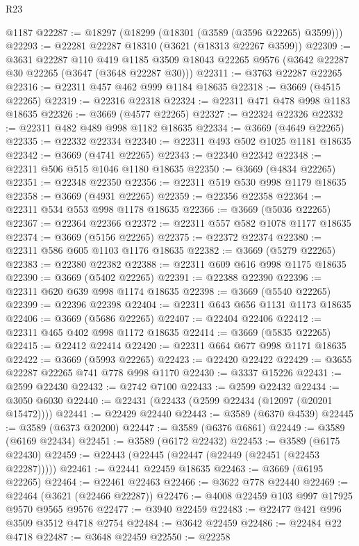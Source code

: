 \begin{lexlean}{R23}
\begin{coremodule}
    @1187
@22287 := @18297 (@18299 (@18301 (@3589 (@3596 @22265) @3599)))
@22293 := @22281 @22287 @18310 (@3621 (@18313 @22267 @3599))
@22309 := @3631
    @22287
    @110
    @419
    @1185
    @3509
    @18043
    @22265
    @9576
    (@3642 @22287 @30 @22265 (@3647 (@3648 @22287 @30)))
@22311 := @3763 @22287 @22265
@22316 := @22311 @457 @462 @999 @1184 @18635
@22318 := @3669 (@4515 @22265)
@22319 := @22316 @22318
@22324 := @22311 @471 @478 @998 @1183 @18635
@22326 := @3669 (@4577 @22265)
@22327 := @22324 @22326
@22332 := @22311 @482 @489 @998 @1182 @18635
@22334 := @3669 (@4649 @22265)
@22335 := @22332 @22334
@22340 := @22311 @493 @502 @1025 @1181 @18635
@22342 := @3669 (@4741 @22265)
@22343 := @22340 @22342
@22348 := @22311 @506 @515 @1046 @1180 @18635
@22350 := @3669 (@4834 @22265)
@22351 := @22348 @22350
@22356 := @22311 @519 @530 @998 @1179 @18635
@22358 := @3669 (@4931 @22265)
@22359 := @22356 @22358
@22364 := @22311 @534 @553 @998 @1178 @18635
@22366 := @3669 (@5036 @22265)
@22367 := @22364 @22366
@22372 := @22311 @557 @582 @1078 @1177 @18635
@22374 := @3669 (@5156 @22265)
@22375 := @22372 @22374
@22380 := @22311 @586 @605 @1103 @1176 @18635
@22382 := @3669 (@5279 @22265)
@22383 := @22380 @22382
@22388 := @22311 @609 @616 @998 @1175 @18635
@22390 := @3669 (@5402 @22265)
@22391 := @22388 @22390
@22396 := @22311 @620 @639 @998 @1174 @18635
@22398 := @3669 (@5540 @22265)
@22399 := @22396 @22398
@22404 := @22311 @643 @656 @1131 @1173 @18635
@22406 := @3669 (@5686 @22265)
@22407 := @22404 @22406
@22412 := @22311 @465 @402 @998 @1172 @18635
@22414 := @3669 (@5835 @22265)
@22415 := @22412 @22414
@22420 := @22311 @664 @677 @998 @1171 @18635
@22422 := @3669 (@5993 @22265)
@22423 := @22420 @22422
@22429 := @3655 @22287 @22265 @741 @778 @998 @1170
@22430 := @3337 @15226
@22431 := @2599 @22430
@22432 := @2742 @7100
@22433 := @2599 @22432
@22434 := @3050 @6030
@22440 := @22431 (@22433 (@2599 @22434 (@12097 (@20201 @15472))))
@22441 := @22429 @22440
@22443 := @3589 (@6370 @4539)
@22445 := @3589 (@6373 @20200)
@22447 := @3589 (@6376 @6861)
@22449 := @3589 (@6169 @22434)
@22451 := @3589 (@6172 @22432)
@22453 := @3589 (@6175 @22430)
@22459 := @22443 (@22445 (@22447 (@22449 (@22451 (@22453 @22287)))))
@22461 := @22441 @22459 @18635
@22463 := @3669 (@6195 @22265)
@22464 := @22461 @22463
@22466 := @3622 @778 @22440
@22469 := @22464 (@3621 (@22466 @22287))
@22476 := @4008 @22459 @103 @997 @17925 @9570 @9565 @9576
@22477 := @3940 @22459
@22483 := @22477 @421 @996 @3509 @3512 @4718 @2754
@22484 := @3642 @22459
@22486 := @22484 @22 @4718
@22487 := @3648 @22459
@22550 := @22258

\end{coremodule}
\end{lexlean}
